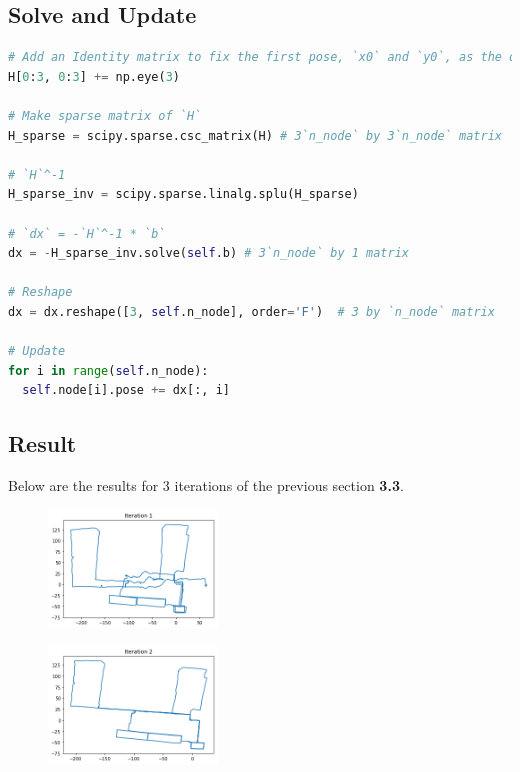 \documentclass{article}
\begin{document}
\newpage

\subsection{Solve and Update}

\begin{lstlisting}[language=python]
# Add an Identity matrix to fix the first pose, `x0` and `y0`, as the origin
H[0:3, 0:3] += np.eye(3)

# Make sparse matrix of `H`
H_sparse = scipy.sparse.csc_matrix(H) # 3`n_node` by 3`n_node` matrix

# `H`^-1
H_sparse_inv = scipy.sparse.linalg.splu(H_sparse)

# `dx` = -`H`^-1 * `b`
dx = -H_sparse_inv.solve(self.b) # 3`n_node` by 1 matrix

# Reshape
dx = dx.reshape([3, self.n_node], order='F')  # 3 by `n_node` matrix

# Update
for i in range(self.n_node):
  self.node[i].pose += dx[:, i]
\end{lstlisting}

\subsection{Result}

Below are the results for 3 iterations of the previous section \textbf{3.3}.

\begin{figure}[h!]
  \centering
  \includegraphics[width=0.4\textwidth]{4-1_by_deleji_1.png}
\end{figure}

\begin{figure}[h!]
  \centering
  \includegraphics[width=0.4\textwidth]{4-2_by_deleji_2.png}
\end{figure}
\end{document}
